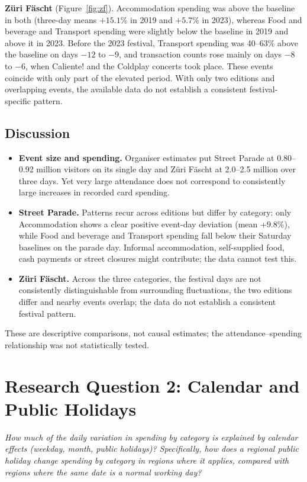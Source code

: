 \documentclass[10pt]{article}
\newcommand{\researchquestion}[1]{%
  \begin{tcolorbox}[blank,left=3.4mm,top=0.6mm,bottom=0.6mm,borderline west={1.8pt}{0pt}{bluerule}]
  {\itshape\color{navy}#1}
  \end{tcolorbox}}
\let\plainsection\section
\renewcommand{\section}{\Needspace*{6\baselineskip}\plainsection}
\begin{document}
\textbf{Züri Fäscht} (Figure~\ref{fig:zf}). Accommodation spending was above the baseline in both (three-day means $+15.1\%$ in 2019 and $+5.7\%$ in 2023), whereas Food and beverage and Transport spending were slightly below the baseline in 2019 and above it in 2023. Before the 2023 festival, Transport spending was 40--63\% above the baseline on days $-12$ to $-9$, and transaction counts rose mainly on days $-8$ to $-6$, when Caliente! and the Coldplay concerts took place. These events coincide with only part of the elevated period. With only two editions and overlapping events, the available data do not establish a consistent festival-specific pattern.

\subsection{Discussion}
\begin{itemize}
\item \textbf{Event size and spending.} Organiser estimates put Street Parade at 0.80--0.92 million visitors on its single day and Züri Fäscht at 2.0--2.5 million over three days. Yet very large attendance does not correspond to consistently large increases in recorded card spending.
\item \textbf{Street Parade.} Patterns recur across editions but differ by category: only Accommodation shows a clear positive event-day deviation (mean $+9.8\%$), while Food and beverage and Transport spending fall below their Saturday baselines on the parade day. Informal accommodation, self-supplied food, cash payments or street closures might contribute; the data cannot test this.
\item \textbf{Züri Fäscht.} Across the three categories, the festival days are not consistently distinguishable from surrounding fluctuations, the two editions differ and nearby events overlap; the data do not establish a consistent festival pattern.
\end{itemize}
These are descriptive comparisons, not causal estimates; the attendance--spending relationship was not statistically tested.

\section{Research Question 2: Calendar and Public Holidays}
\label{sec:q2}
\researchquestion{How much of the daily variation in spending by category is explained by calendar effects (weekday, month, public holidays)? Specifically, how does a regional public holiday change spending by category in regions where it applies, compared with regions where the same date is a normal working day?}
\end{document}
